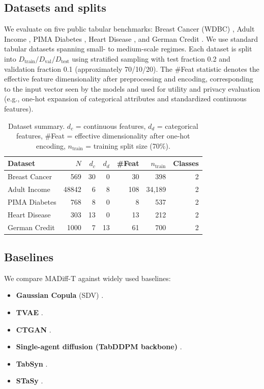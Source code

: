 \documentclass[preprint,12pt]{elsarticle}
\begin{document}
\subsection{Datasets and splits}
We evaluate on five public tabular benchmarks: Breast Cancer (WDBC) \cite{BreastCancerWDBC}, Adult Income \cite{AdultIncome}, PIMA Diabetes \cite{PimaDiabetes}, Heart Disease \cite{HeartDisease}, and German Credit \cite{GermanCredit}.
We use standard tabular datasets spanning small- to medium-scale regimes. Each dataset is split into $D_{\text{train}}/D_{\text{val}}/D_{\text{test}}$ 
using stratified sampling with test fraction 0.2 and validation 
fraction 0.1 (approximately 70/10/20). The \#Feat statistic denotes the effective feature dimensionality after preprocessing and encoding, corresponding to the input vector seen by the models and used for utility and privacy evaluation (e.g., one-hot expansion of categorical attributes and standardized continuous features).
\begin{table}[t]
\centering
\caption{Dataset summary. $d_c$ = continuous features, $d_d$ = categorical features, \#Feat = effective dimensionality after one-hot encoding, $n_{\text{train}}$ = training split size (70\%).}
\label{tab:datasets}
\scriptsize
\setlength{\tabcolsep}{5pt}
\renewcommand{\arraystretch}{1.1}
\begin{tabular}{l r r r r r r}
\toprule
\rowcolor{tablehead}
\textbf{Dataset} & \textbf{$N$} & \textbf{$d_c$} & \textbf{$d_d$} & \textbf{\#Feat} & \textbf{$n_{\text{train}}$} & \textbf{Classes} \\
\midrule
Breast Cancer  & 569   & 30 & 0  & 30  & 398 & 2 \\
Adult Income   & 48842 & 6  & 8  & 108 & 34{,}189 & 2 \\
PIMA Diabetes  & 768   & 8  & 0  & 8   & 537 & 2 \\
Heart Disease  & 303   & 13 & 0  & 13  & 212 & 2 \\
German Credit  & 1000  & 7  & 13 & 61  & 700 & 2 \\
\bottomrule
\end{tabular}
\end{table}

\subsection{Baselines}
We compare MADiff-T against widely used baselines:
\begin{itemize}
    \item \textbf{Gaussian Copula} (SDV) \cite{Patki2016}.
    \item \textbf{TVAE} \cite{Xu2019b}.
    \item \textbf{CTGAN} \cite{Xu2019a}.
    \item \textbf{Single-agent diffusion (TabDDPM backbone)} \cite{Kotelnikov2023}.
    \item \textbf{TabSyn} \cite{Zhang2024}.
    \item \textbf{STaSy} \cite{Kim2023}.
\end{itemize}
\end{document}
